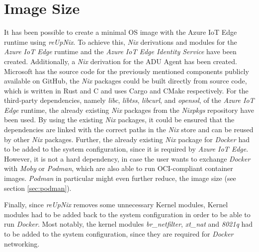 
\section{Image Size}
It has been possible to create a minimal \ac{OS} image with the Azure IoT Edge runtime
using \textit{reUpNix}. To achieve this, \textit{Nix} derivations and modules for
the \textit{Azure IoT Edge} runtime and the \textit{Azure IoT Edge Identity Service}
have been created. Additionally, a \textit{Nix} derivation for the \ac{ADU} Agent has been created.
Microsoft has the source code for the previously mentioned components
publicly available on GitHub, the \textit{Nix} packages could be built directly
from source code, which is written in Rust and C and uses Cargo and CMake respectively.
For the third-party dependencies, namely \textit{libc}, \textit{libtss}, \textit{libcurl}, and
\textit{openssl}, of the \textit{Azure IoT Edge} runtime, the already existing \textit{Nix} packages
from the \textit{Nixpkgs} repository have been used.
By using the existing \textit{Nix} packages, it could be ensured that the dependencies
are linked with the correct paths in the \textit{Nix} store and can be reused
by other \textit{Nix} packages.
Further, the already existing \textit{Nix} package for \textit{Docker} had to be added
to the system configuration, since it is required by \textit{Azure IoT Edge}.
However, it is not a hard dependency, in case the user wants to exchange \textit{Docker}
with \textit{Moby} or \textit{Podman}, which are also able to run \ac{OCI}-compliant
container images. \textit{Podman} in particular might even further reduce, the
image size (see section \ref{sec:podman}).

Finally, since \textit{reUpNix} removes some unnecessary
Kernel modules, Kernel modules had to be added back to the system configuration in order
to be able to run \textit{Docker}.
Most notably, the kernel modules
\textit{br\_netfilter}, \textit{xt\_nat} and \textit{8021q} had to be added to the system configuration,
since they are required for \textit{Docker} networking.

